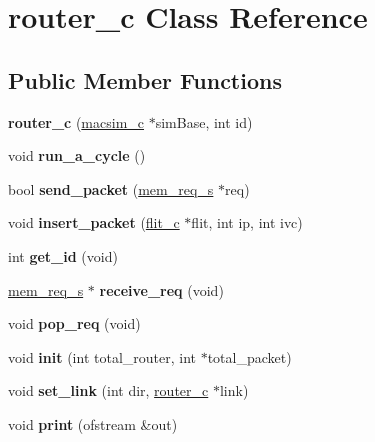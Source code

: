 \hypertarget{classrouter__c}{
\section{router\_\-c Class Reference}
\label{classrouter__c}
}
\subsection*{Public Member Functions}
\begin{DoxyCompactItemize}
\item 
\hypertarget{classrouter__c_ab01a77943a7fb64d2d300034da7be4fa}{
{\bfseries router\_\-c} (\hyperlink{classmacsim__c}{macsim\_\-c} $\ast$simBase, int id)}
\label{classrouter__c_ab01a77943a7fb64d2d300034da7be4fa}

\item 
\hypertarget{classrouter__c_ac8af2d91c99b3d0e1bc6c62a7e0c27ca}{
void {\bfseries run\_\-a\_\-cycle} ()}
\label{classrouter__c_ac8af2d91c99b3d0e1bc6c62a7e0c27ca}

\item 
\hypertarget{classrouter__c_a7299b1bcac34bb26a3902dd6d1494f0e}{
bool {\bfseries send\_\-packet} (\hyperlink{structmem__req__s}{mem\_\-req\_\-s} $\ast$req)}
\label{classrouter__c_a7299b1bcac34bb26a3902dd6d1494f0e}

\item 
\hypertarget{classrouter__c_af92b75d0e24e0e459d54aac07ba89eb1}{
void {\bfseries insert\_\-packet} (\hyperlink{classflit__c}{flit\_\-c} $\ast$flit, int ip, int ivc)}
\label{classrouter__c_af92b75d0e24e0e459d54aac07ba89eb1}

\item 
\hypertarget{classrouter__c_a1da67ae7a06a4f9e509d29de1e488860}{
int {\bfseries get\_\-id} (void)}
\label{classrouter__c_a1da67ae7a06a4f9e509d29de1e488860}

\item 
\hypertarget{classrouter__c_a0bccef3de4c1ac2f2600ab28c69a01d4}{
\hyperlink{structmem__req__s}{mem\_\-req\_\-s} $\ast$ {\bfseries receive\_\-req} (void)}
\label{classrouter__c_a0bccef3de4c1ac2f2600ab28c69a01d4}

\item 
\hypertarget{classrouter__c_afcbde0afcc5a0390217225bb4a5f23dd}{
void {\bfseries pop\_\-req} (void)}
\label{classrouter__c_afcbde0afcc5a0390217225bb4a5f23dd}

\item 
\hypertarget{classrouter__c_a31fc049b817749e64088847997e60a46}{
void {\bfseries init} (int total\_\-router, int $\ast$total\_\-packet)}
\label{classrouter__c_a31fc049b817749e64088847997e60a46}

\item 
\hypertarget{classrouter__c_a9b9cb79a2bba25571f23cd26b33e6d22}{
void {\bfseries set\_\-link} (int dir, \hyperlink{classrouter__c}{router\_\-c} $\ast$link)}
\label{classrouter__c_a9b9cb79a2bba25571f23cd26b33e6d22}

\item 
\hypertarget{classrouter__c_aa9213f4bac01fe02e1905186a58628ec}{
void {\bfseries print} (ofstream \&out)}
\label{classrouter__c_aa9213f4bac01fe02e1905186a58628ec}

\end{DoxyCompactItemize}
